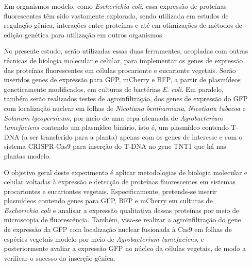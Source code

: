 Em organismos modelo, como \textit{Escherichia coli}, essa expressão de
proteínas fluorescentes têm sido vastamente explorada, sendo utilizada em
estudos de regulação gênica, interações entre proteínas e até em otimizações de
métodos de edição genética para utilização em outros
organismos\cite{ruiz_silhavy_2022}. 

No presente estudo, serão utilizadas essas duas ferramentes, acopladas com
outras técnicas de biologia molecular e celular, para implementar os genes de
expressão das proteínas fluorescentes em células procarionte e eucarionte
vegetais. Serão inseridos genes de expressão para GFP, mCherry e BFP, a partir
de plasmídeos geneticamente modificados, em culturas de bactérias \textit{E.
coli}. Em paralelo, também serão realizados testes de agroinfiltração, dos genes
de expressão do GFP com localização nuclear em folhas de \textit{Nicotiana
benthamiana}, \textit{Nicotiana tabacoa} e \textit{Solanum lycopersicum}, por
meio de uma cepa atenuada de \textit{Agrobacterium tumefaciens} contendo um
plasmídeo binário, isto é, um plasmídeo contendo T-DNA (a ser transferido para a
planta) apenas com os genes de interesse e com o sistema CRISPR-Cas9 para
inserção do T-DNA no gene TNT1 que há nas plantas
modelo\cite{hernández-pinzón_2012}.

O objetivo geral deste experimento é aplicar metodologias de biologia molecular
e celular voltadas à expressão e detecção de proteínas fluorescentes em sistemas
procariontes e eucariontes vegetais. Especificamente, pretende-se inserir
plasmídeos contendo genes para GFP, BFP e mCherry em culturas de
\textit{Escherichia coli}  e analisar a expressão qualitativa dessas proteínas
por meio de microscopia de fluorescência. Também, visa-se realizar a
agroinfiltração do gene de expressão da GFP com localização nuclear fusionada à Cas9 em folhas
de espécies vegetais modelo por meio de \textit{Agrobacterium tumefaciens}, e
posteriormente avaliar a expressão GFP no núcleo da células vegetais, de modo a
verificar o sucesso da inserção gênica. 
